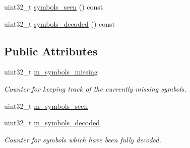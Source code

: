 \begin{DoxyCompactItemize}
\begin{DoxyCompactList}\small\item\em \end{DoxyCompactList}\item 
uint32\-\_\-t \hyperlink{classkodo_1_1symbol__decoding__status__counter_a1ccc2d54e045a38f3a61e485a19dea57}{symbols\-\_\-seen} () const 
\begin{DoxyCompactList}\small\item\em \end{DoxyCompactList}\item 
uint32\-\_\-t \hyperlink{classkodo_1_1symbol__decoding__status__counter_a21d0bfbd0bab67f42e7b0e9f6150666d}{symbols\-\_\-decoded} () const 
\begin{DoxyCompactList}\small\item\em \end{DoxyCompactList}\end{DoxyCompactItemize}
\subsection*{Public Attributes}
\begin{DoxyCompactItemize}
\item 
\hypertarget{classkodo_1_1symbol__decoding__status__counter_a818603dbe1428fc230ef8764e3dc6560}{uint32\-\_\-t \hyperlink{classkodo_1_1symbol__decoding__status__counter_a818603dbe1428fc230ef8764e3dc6560}{m\-\_\-symbols\-\_\-missing}}\label{classkodo_1_1symbol__decoding__status__counter_a818603dbe1428fc230ef8764e3dc6560}

\begin{DoxyCompactList}\small\item\em Counter for keeping track of the currently missing symbols. \end{DoxyCompactList}\item 
uint32\-\_\-t \hyperlink{classkodo_1_1symbol__decoding__status__counter_a3d13d01ddf0cc30601c32c0546057572}{m\-\_\-symbols\-\_\-seen}
\item 
\hypertarget{classkodo_1_1symbol__decoding__status__counter_a5dff727cb161c4de980d4304ab13e156}{uint32\-\_\-t \hyperlink{classkodo_1_1symbol__decoding__status__counter_a5dff727cb161c4de980d4304ab13e156}{m\-\_\-symbols\-\_\-decoded}}\label{classkodo_1_1symbol__decoding__status__counter_a5dff727cb161c4de980d4304ab13e156}

\begin{DoxyCompactList}\small\item\em Counter for symbols which have been fully decoded. \end{DoxyCompactList}\end{DoxyCompactItemize}


